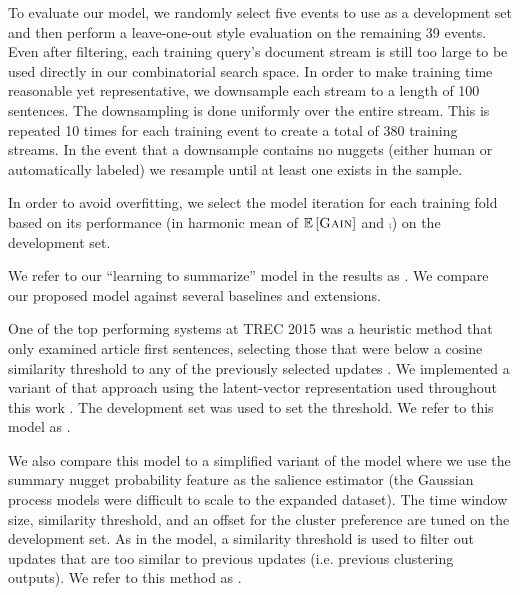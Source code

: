 To evaluate our model, we randomly select five events to use as a
 development set and then perform a leave-one-out style evaluation on the
 remaining 39 events.
 Even after filtering,  each training query's document stream is still too
 large to be used directly in our combinatorial search space. In order to
 make training time reasonable yet representative, we downsample each stream
 to a length of 100 sentences. The downsampling is done uniformly over the
 entire stream. This is repeated 10 times for each training event to create a
 total of 380 training streams. In the event that a downsample contains no
 nuggets (either human or automatically labeled) we resample until at least
 one exists in the sample. 

 In order to avoid overfitting, we select the model iteration for each
 training fold based on its performance (in harmonic mean of $\mathbb{E}\left[\textsc{Gain}\right]$ and
 $\comp$) on the development set.


 We refer to our ``learning to summarize'' model in the results as 
 \modelLS.
 We compare our proposed model against several baselines and extensions. 

 One of the top performing systems 
 at TREC 2015 was a heuristic method that only
 examined article first sentences, selecting those that were below a cosine
 similarity threshold to any of the previously selected updates \citep{clarke2015}. We
 implemented a variant of that approach using the latent-vector
 representation used throughout this work \citep{guo2012simple}. 
 The development set was used to
 set the threshold. We refer to this model as \modelCos{}.
  
 We also compare this model to a simplified variant of the \sap{} model
where we use the summary
nugget probability feature as the salience estimator (the Gaussian process
models were difficult to scale to the expanded dataset).  The time
 window size, similarity threshold, and an offset for the cluster preference
 are tuned on the development set.
 As in the \modelCos{} model, a
 similarity threshold is used to filter out updates that are too similar to
 previous updates (i.e. previous clustering outputs).    
 We refer to this method as \sap.  


